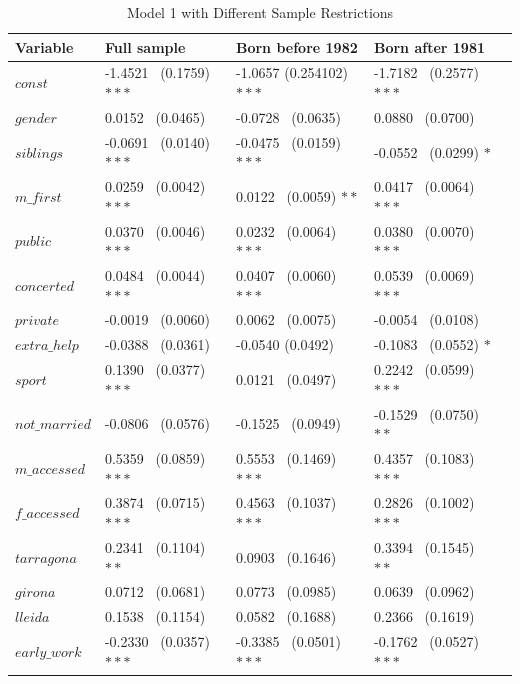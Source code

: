 \documentclass[12pt]{article}
\begin{document}
\begin{table} [ht]
\caption{Model 1 with Different Sample Restrictions}
\begin{center}
\begin{tabular}{l|l|l|l p{}}
\textbf{Variable}&\textbf{Full sample}&\textbf{Born before 1982}&\textbf{Born after 1981}\\
\hline
$const$&-1.4521 \ (0.1759) $\ast\ast\ast$ &-1.0657 (0.254102) $\ast\ast\ast$ &-1.7182 \ (0.2577) $\ast\ast\ast$\\
\hline
$gender$&0.0152 \ (0.0465) & -0.0728 \ (0.0635) &0.0880 \ (0.0700)\\
\hline
$siblings$&-0.0691 \ (0.0140) $\ast\ast\ast$ & -0.0475 \ (0.0159) $\ast\ast\ast$ &-0.0552 \ (0.0299) $\ast$\\
\hline
$m\_{first}$&0.0259 \ (0.0042) $\ast\ast\ast$ & 0.0122 \ (0.0059) $\ast\ast$ &0.0417 \ (0.0064) $\ast\ast\ast$\\
\hline
$public$&0.0370 \ (0.0046) $\ast\ast\ast$ & 0.0232 \ (0.0064) $\ast\ast\ast$&0.0380 \ (0.0070) $\ast\ast\ast$\\
\hline
$concerted$&0.0484 \ (0.0044) $\ast\ast\ast$ &0.0407 \ (0.0060) $\ast\ast\ast$&0.0539 \ (0.0069) $\ast\ast\ast$\\
\hline
$private$&-0.0019 \ (0.0060) &0.0062 \ (0.0075)&-0.0054 \ (0.0108)\\
\hline
$extra\_{help}$&-0.0388 \ (0.0361)&-0.0540 (0.0492)&-0.1083 \ (0.0552) $\ast$\\
\hline
$sport$&0.1390 \ (0.0377) $\ast\ast\ast$&0.0121 \ (0.0497) &0.2242 \ (0.0599) $\ast\ast\ast$\\
\hline
$not\_{married}$&-0.0806 \ (0.0576)&-0.1525 \ (0.0949)&-0.1529 \ (0.0750) $\ast\ast$\\
\hline
$m\_{accessed}$&0.5359 \ (0.0859) $\ast\ast\ast$&0.5553 \ (0.1469) $\ast\ast\ast$&0.4357 \ (0.1083) $\ast\ast\ast$\\
\hline
$f\_{accessed}$&0.3874 \ (0.0715) $\ast\ast\ast$&0.4563 \ (0.1037) $\ast\ast\ast$&0.2826 \ (0.1002) $\ast\ast\ast$\\
\hline
$tarragona$&0.2341 \ (0.1104) $\ast\ast$&0.0903 \ (0.1646)&0.3394 \ (0.1545) $\ast\ast$\\
\hline
$girona$&0.0712 \ (0.0681)&0.0773 \ (0.0985)&0.0639 \ (0.0962)\\
\hline
$lleida$&0.1538 \ (0.1154)&0.0582 \ (0.1688)&0.2366 \ (0.1619)\\
\hline
$early\_{work}$&-0.2330 \ (0.0357) $\ast\ast\ast$&-0.3385 \ (0.0501) $\ast\ast\ast$&-0.1762 \ (0.0527) $\ast\ast\ast$\\

\end{tabular}
\end{center}
\end{table}
\end{document}
